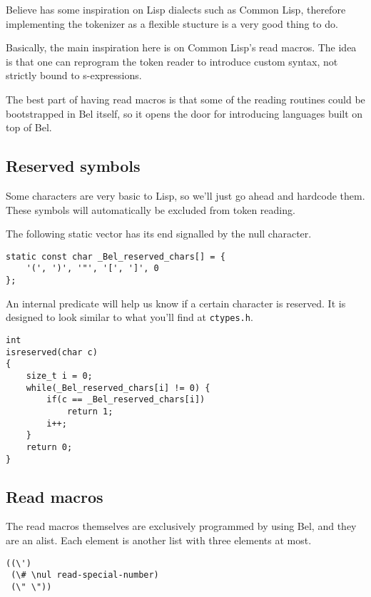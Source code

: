 \documentclass[openright,a4paper,twoside,12pt]{memoir}
\begin{document}
Believe has  some inspiration  on Lisp dialects  such as  Common Lisp,
therefore implementing the tokenizer as  a flexible stucture is a very
good thing to do.

Basically,  the  main  inspiration  here  is  on  Common  Lisp's  read
macros.  The idea  is  that  one can  reprogram  the  token reader  to
introduce custom syntax, not strictly bound to s-expressions.

The  best part  of having  read  macros is  that some  of the  reading
routines could be bootstrapped in Bel itself, so it opens the door for
introducing languages built on top of Bel.

\subsection{Reserved symbols}
\label{sec:org3090260}

Some characters  are very basic  to Lisp, so  we'll just go  ahead and
hardcode them. These symbols will automatically be excluded from token
reading.

The following static vector has its end signalled by the null character.

\begin{verbatim}
static const char _Bel_reserved_chars[] = {
    '(', ')', '"', '[', ']', 0
};
\end{verbatim}

An internal  predicate will  help us  know if  a certain  character is
reserved.  It is  designed  to look  similar to  what  you'll find  at
\texttt{ctypes.h}.

\begin{verbatim}
int
isreserved(char c)
{
    size_t i = 0;
    while(_Bel_reserved_chars[i] != 0) {
        if(c == _Bel_reserved_chars[i])
            return 1;
        i++;
    }
    return 0;
}
\end{verbatim}

\subsection{Read macros}
\label{sec:orge4f4a00}

The read  macros themselves are  exclusively programmed by  using Bel,
and  they are  an  alist.  Each element  is  another  list with  three
elements at most.

\begin{verbatim}
((\')
 (\# \nul read-special-number)
 (\" \"))
\end{verbatim}
\end{document}
